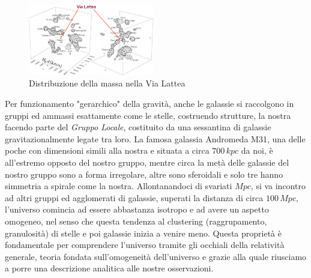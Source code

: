 \documentclass[a4paper,twoside,openany,notitlepage]{book}
\theoremstyle{definition}
\theoremstyle{plain}
\begin{document}
\begin{figure}
	\vspace{-10pt}
	\centering
	\includegraphics[width=0.49\textwidth]{./Immagini/Capitolo1/Gruppo_locale.PNG}
	\caption*{Distribuzione della massa nella Via Lattea}
	\vspace{-10pt}
\end{figure}

Per funzionamento "gerarchico" della gravità, anche le galassie si raccolgono in gruppi ed ammassi esattamente come le stelle, costruendo strutture, la nostra facendo parte del \textit{Gruppo Locale}, costituito da una sessantina di galassie gravitazionalmente legate tra loro. La famosa galassia Andromeda M31, una delle poche con dimensioni simili alla nostra e situata a circa $700\,kpc$ da noi, è all'estremo opposto del nostro gruppo, mentre circa la metà delle galassie del nostro gruppo sono a forma irregolare, altre sono sferoidali e solo tre hanno simmetria a spirale come la nostra. Allontanandoci di svariati $Mpc$, si va incontro ad altri gruppi ed agglomerati di galassie, superati la distanza di circa $100\,Mpc$, l'universo comincia ad essere abbastanza isotropo e ad avere un aspetto omogeneo, nel senso che questa tendenza al clustering (raggrupamento, granulosità) di stelle e poi galassie inizia a venire meno. Questa proprietà è fondamentale per comprendere l'universo tramite gli occhiali della relatività generale, teoria fondata sull'omogeneità dell'universo e grazie alla quale riusciamo a porre una descrizione analitica alle nostre osservazioni. 
\end{document}
